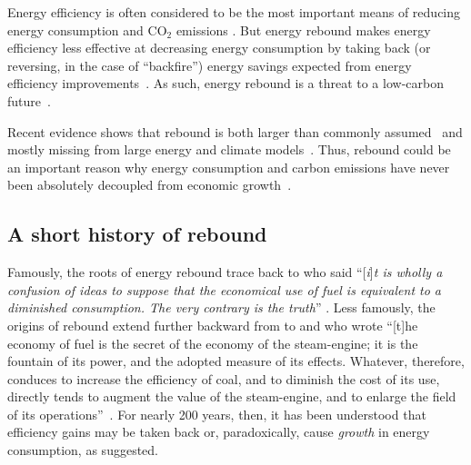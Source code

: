 \documentclass[12pt]{article}\usepackage[]{graphicx}\usepackage[]{xcolor}
\begin{document}
Energy efficiency is often considered to be
the most important means of reducing energy consumption
and CO$_2$ emissions \citep[Fig.~3.15, p.~139]{International-Energy-Agency:2017b}.
But energy rebound makes energy efficiency less effective
at decreasing energy consumption 
by taking back (or reversing, in the case of ``backfire'') 
energy savings expected from energy efficiency improvements~\citep{Sorrell:2009cg}.
As such, energy rebound is a threat to
a low-carbon future~\citep{van-den-Bergh:2017aa, Brockway:2017a}.

Recent evidence shows that rebound is both 
larger than commonly assumed~\citep{Stern2020} and
mostly missing from large energy and climate models~\citep{Brockway:2021ww}.
Thus, rebound could be an important reason why
energy consumption and carbon emissions 
have never been absolutely decoupled 
from economic growth~\citep{Haberl:2020tf, Brockway:2021ww}.


\subsection{A short history of rebound}
\label{sec:short_history}

Famously, the roots of energy rebound trace back to 
\citeauthor{Jevons:1865} who said 
``[\emph{i}]\emph{t is wholly a confusion of ideas to suppose that the economical 
use of fuel is equivalent to a diminished consumption. 
The very contrary is the truth}'' \citep[p.~103, emphasis in original]{Jevons:1865}.
Less famously, the origins of rebound extend further backward 
from \citeauthor{Jevons:1865}
to \citet{Williams1840} and \citeauthor{Parkes1838} who wrote
``[t]he economy of fuel is the secret of the economy of the steam-engine; 
it is the fountain of its power, and the adopted measure of its effects. 
Whatever, therefore, conduces to increase the efficiency of coal, 
and to diminish the cost of its use, 
directly tends to augment the value of the steam-engine, 
and to enlarge the field of its operations''~\citep[p.~161]{Parkes1838}.
For nearly 200 years, then, it has been understood 
that efficiency gains may be taken back or, paradoxically, 
cause \emph{growth} in energy consumption,
as \citeauthor{Jevons:1865} suggested.
\end{document}
